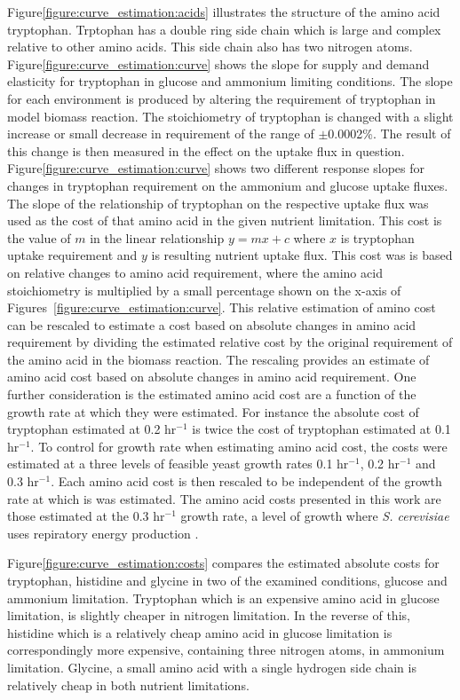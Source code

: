 Figure\ref{figure:curve_estimation:acids} illustrates the structure of the amino acid tryptophan. Trptophan has a double ring side chain which is large and complex relative to other amino acids. This side chain also has two nitrogen atoms. Figure\ref{figure:curve_estimation:curve} shows the slope for supply and demand elasticity for tryptophan in glucose and ammonium limiting conditions. The slope for each environment is produced by altering the requirement of tryptophan in model biomass reaction. The stoichiometry of tryptophan is changed with a slight increase or small decrease in requirement of the range of $\pm$0.0002\%. The result of this change is then measured in the effect on the uptake flux in question. Figure\ref{figure:curve_estimation:curve} shows two different response slopes for changes in tryptophan requirement on the ammonium and glucose uptake fluxes. The slope of the relationship of tryptophan on the respective uptake flux was used as the cost of that amino acid in the given nutrient limitation. This cost is the value of $m$ in the linear relationship $y = mx + c$ where $x$ is tryptophan uptake requirement and $y$ is resulting nutrient uptake flux. This cost was is based on relative changes to amino acid requirement, where the  amino acid stoichiometry is multiplied by a small percentage shown on the x-axis of Figures~\vref{figure:curve_estimation:curve}. This relative estimation of amino cost can be rescaled to estimate a cost based on absolute changes in amino acid requirement by dividing the estimated relative cost by the original requirement of the amino acid in the biomass reaction. The rescaling provides an estimate of amino acid cost based on absolute changes in amino acid requirement. One further consideration is the estimated amino acid cost are a function of the growth rate at which they were estimated. For instance the absolute cost of tryptophan estimated at 0.2 hr$^{-1}$ is twice the cost of tryptophan estimated at 0.1 hr$^{-1}$. To control for growth rate when estimating amino acid cost, the costs were estimated at a three levels of feasible yeast growth rates 0.1 hr$^{-1}$, 0.2 hr$^{-1}$ and 0.3 hr$^{-1}$. Each amino acid cost is then rescaled to be independent of the growth rate at which is was estimated. The amino acid costs presented in this work are those estimated at the 0.3 hr$^{-1}$ growth rate, a level of growth where \emph{S. cerevisiae} uses repiratory energy production \cite{famili2003}.

Figure\ref{figure:curve_estimation:costs} compares the estimated absolute costs for tryptophan, histidine and glycine in two of the examined conditions, glucose and ammonium limitation. Tryptophan which is an expensive amino acid in glucose limitation, is slightly cheaper in nitrogen limitation. In the reverse of this, histidine which is a relatively cheap amino acid in glucose limitation is correspondingly more expensive, containing three nitrogen atoms, in ammonium limitation. Glycine, a small amino acid with a single hydrogen side chain is relatively cheap in both nutrient limitations.

